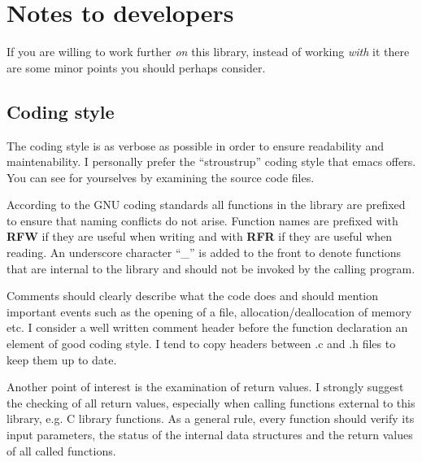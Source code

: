 \documentclass[12pt, a4paper]{article}
\begin{document}
\section{Notes to developers}
If you are willing to work further \emph{on} this library, instead of working
\emph{with} it there are some minor points you should perhaps consider.

\subsection{Coding style}
 The coding style is as verbose as possible in order to ensure readability and
maintenability. I personally prefer the ``stroustrup'' coding style that emacs
offers. You can see for yourselves by examining the source code files. 

 According to the GNU coding standards all functions in the library are prefixed
to ensure that naming conflicts do not arise. Function names are prefixed with
{\bf RFW} if they are useful when writing and with {\bf RFR} if they are useful when 
reading. An underscore character ``\_'' is added to the front to denote functions
that are internal to the library and should not be invoked by the calling
program. 

 Comments should clearly describe what the code does and should mention important
events such as the opening of a file, allocation/deallocation of memory etc.
I consider a well written comment header before the function declaration
an element of good coding style. I tend to copy headers between .c and .h files 
to keep them up to date.

 Another point of interest is the examination of return values. I strongly 
suggest the checking of all return values, especially when calling functions
external to this library, e.g. C library functions. As a general rule, 
every function should verify its input parameters, the status of the internal
data structures and the return values of all called functions.
\end{document}
